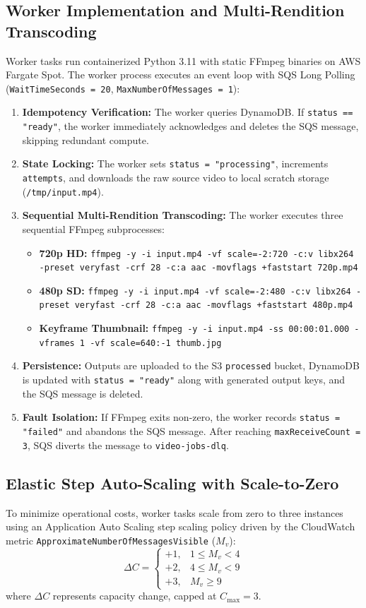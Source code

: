 \documentclass[conference]{IEEEtran}
\begin{document}
\subsection{Worker Implementation and Multi-Rendition Transcoding}
Worker tasks run containerized Python 3.11 with static FFmpeg binaries on AWS Fargate Spot. The worker process executes an event loop with SQS Long Polling (\texttt{WaitTimeSeconds = 20}, \texttt{MaxNumberOfMessages = 1}):
\begin{enumerate}
    \item \textbf{Idempotency Verification:} The worker queries DynamoDB. If \texttt{status == "ready"}, the worker immediately acknowledges and deletes the SQS message, skipping redundant compute.
    \item \textbf{State Locking:} The worker sets \texttt{status = "processing"}, increments \texttt{attempts}, and downloads the raw source video to local scratch storage (\texttt{/tmp/input.mp4}).
    \item \textbf{Sequential Multi-Rendition Transcoding:} The worker executes three sequential FFmpeg subprocesses:
    \begin{itemize}
        \item \textbf{720p HD:} \texttt{ffmpeg -y -i input.mp4 -vf scale=-2:720 -c:v libx264 -preset veryfast -crf 28 -c:a aac -movflags +faststart 720p.mp4}
        \item \textbf{480p SD:} \texttt{ffmpeg -y -i input.mp4 -vf scale=-2:480 -c:v libx264 -preset veryfast -crf 28 -c:a aac -movflags +faststart 480p.mp4}
        \item \textbf{Keyframe Thumbnail:} \texttt{ffmpeg -y -i input.mp4 -ss 00:00:01.000 -vframes 1 -vf scale=640:-1 thumb.jpg}
    \end{itemize}
    \item \textbf{Persistence:} Outputs are uploaded to the S3 \texttt{processed} bucket, DynamoDB is updated with \texttt{status = "ready"} along with generated output keys, and the SQS message is deleted.
    \item \textbf{Fault Isolation:} If FFmpeg exits non-zero, the worker records \texttt{status = "failed"} and abandons the SQS message. After reaching \texttt{maxReceiveCount = 3}, SQS diverts the message to \texttt{video-jobs-dlq}.
\end{enumerate}

\subsection{Elastic Step Auto-Scaling with Scale-to-Zero}
To minimize operational costs, worker tasks scale from zero to three instances using an Application Auto Scaling step scaling policy driven by the CloudWatch metric \texttt{ApproximateNumberOfMessagesVisible} ($M_v$):
\begin{equation}
\Delta C = 
\begin{cases} 
+1, & 1 \le M_v < 4 \\
+2, & 4 \le M_v < 9 \\
+3, & M_v \ge 9 
\end{cases}
\end{equation}
where $\Delta C$ represents capacity change, capped at $C_{\text{max}} = 3$.
\end{document}
